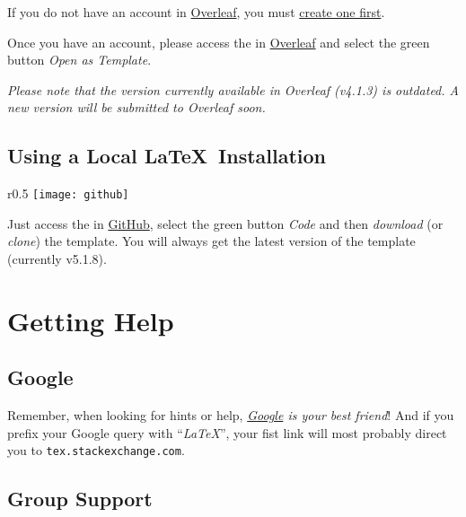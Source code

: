 If you do not have an account in \href{https://www.overleaf.com?r=f5160636&rm=d&rs=b}{Overleaf}, you must \href{https://www.overleaf.com?r=f5160636&rm=d&rs=b}{create one first}.

Once you have an account, please access the  in \href{https://www.overleaf.com/latex/templates/new-university-of-lisbon-universidade-nova-de-lisboa-slash-unl-thesis-template/fwbztcrptjmg}{Overleaf} and select the green button \emph{Open as Template}. 

\emph{Please note that the version currently available in Overleaf (v4.1.3) is outdated. A new version will be submitted to Overleaf soon.}  

\subsection{Using a Local \LaTeX\ Installation}
\label{sub:using_local_latex}

\begin{wrapfigure}{r}{0.5\linewidth}
\vspace*{-15ex}\texttt{[image: github]}%
\end{wrapfigure}

Just access the  in \href{https://github.com/joaomlourenco/novathesis}{GitHub}, select the green button \emph{Code} and then \emph{download} (or \emph{clone}) the template.  You will always get the latest version of the template (currently v5.1.8).


\section{Getting Help}
\label{sec:getting_help}

\begin{center}  
\end{center}
 
\subsection{Google}
\label{sub:group_google}

Remember, when looking for hints or help, \emph{\href{google.com}{Google} is your best friend}!   And if you prefix your Google query with “\emph{LaTeX}”, your fist link will most probably direct you to \texttt{tex.stackexchange.com}.

\subsection{Group Support}
\label{sub:group_support}

